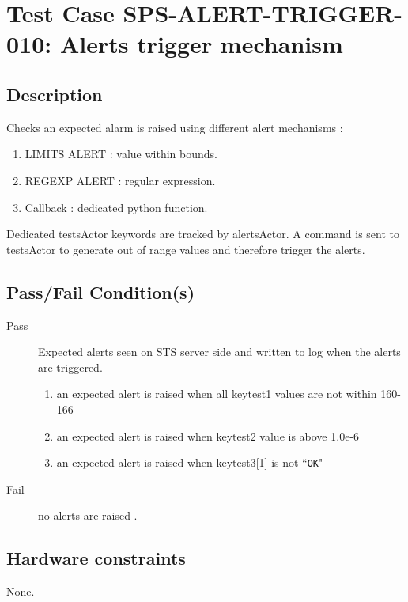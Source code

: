 \section{Test Case SPS-ALERT-TRIGGER-010: Alerts trigger mechanism}

\subsection{Description}

Checks an expected alarm is raised using different alert mechanisms :
\begin{enumerate}
    \item LIMITS ALERT : value within bounds.
    \item REGEXP ALERT : regular expression.
    \item Callback : dedicated python function.
\end{enumerate}

Dedicated testsActor keywords are tracked by alertsActor.
A command is sent to testsActor to generate out of range values and therefore trigger the alerts.


\subsection{Pass/Fail Condition(s)}

\begin{description}
\item [Pass] Expected alerts seen on STS server side and written to log when the alerts are triggered.

\begin{enumerate}
    \item an expected alert is raised when all keytest1 values are not within 160-166
    \item an expected alert is raised when keytest2 value is above 1.0e-6
    \item an expected alert is raised when keytest3[1] is not ``\texttt{OK}"
\end{enumerate}


\item [Fail] no alerts are raised .
\end{description}

\subsection{Hardware constraints}

None.

